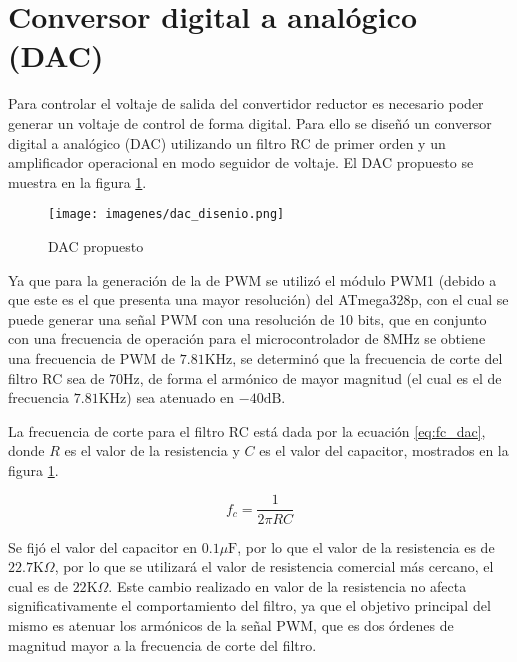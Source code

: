 \section{Conversor digital a analógico (DAC)}

    Para controlar el voltaje de salida del convertidor reductor es necesario
    poder generar un voltaje de control de forma digital. Para ello se diseñó
    un conversor digital a analógico (DAC) utilizando un filtro RC de primer
    orden y un amplificador operacional en modo seguidor de voltaje. El DAC
    propuesto se muestra en la figura \ref{fig:dac}.

    \begin{figure}[H]
        \centering
        \texttt{[image: imagenes/dac\_disenio.png]}
        \caption{DAC propuesto}
        \label{fig:dac}
    \end{figure}

    Ya que para la generación de la de PWM se utilizó el módulo PWM1 (debido
    a que este es el que presenta una mayor resolución) del ATmega328p, con el 
    cual se puede generar una señal PWM con una resolución de 10 bits, que en
    conjunto con una frecuencia de operación para el microcontrolador de $8\text{MHz}$
    se obtiene una frecuencia de PWM de $7.81\text{KHz}$, se determinó que la 
    frecuencia de corte del filtro RC sea de $70\text{Hz}$, de forma el armónico
    de mayor magnitud (el cual es el de frecuencia $7.81\text{KHz}$) sea atenuado
    en $-40\text{dB}$. 

    La frecuencia de corte para el filtro RC está dada por la ecuación \ref{eq:fc_dac},
    donde $R$ es el valor de la resistencia y $C$ es el valor del capacitor, mostrados
    en la figura \ref{fig:dac}.

    \begin{equation}
        f_c = \frac{1}{2\pi RC}
        \label{eq:fc_dac}
    \end{equation}

    Se fijó el valor del capacitor en $0.1\mu\text{F}$, por lo que el valor de la
    resistencia es de $22.7\text{K}\Omega$, por lo que se utilizará el valor 
    de resistencia comercial más cercano, el cual es de $22\text{K}\Omega$.
    Este cambio realizado en valor de la resistencia no afecta
    significativamente el comportamiento del filtro, ya que el objetivo 
    principal del mismo es atenuar los armónicos de la señal PWM, que es 
    dos órdenes de magnitud mayor a la frecuencia de corte del filtro.

